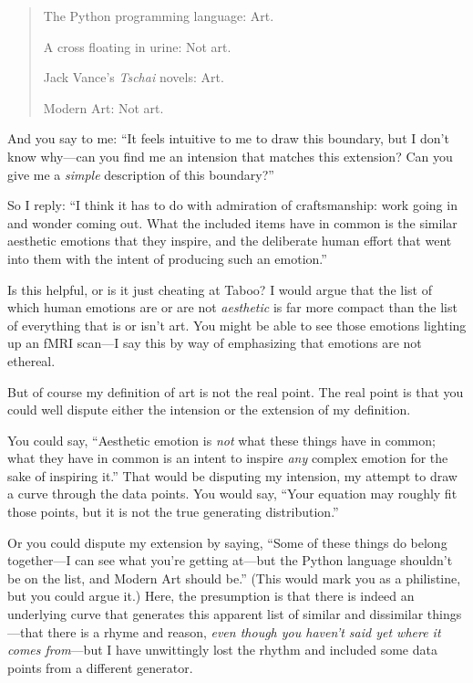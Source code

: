 {{\begin{quote}
{
 The Python programming language: Art.}

{
 A cross floating in urine: Not art.}

{
 Jack Vance's \textit{Tschai} novels: Art.}

{
  Modern Art: Not art.}
\end{quote}

{
 And you say to me: ``It feels intuitive to me to
draw this boundary, but I don't know why---can you find
me an intension that matches this extension? Can you give me a
\textit{simple} description of this boundary?''}

{
 So I reply: ``I think it has to do with
admiration of craftsmanship: work going in and wonder coming out. What
the included items have in common is the similar aesthetic emotions
that they inspire, and the deliberate human effort that went into them
with the intent of producing such an emotion.''}

{
 Is this helpful, or is it just cheating at Taboo? I would argue
that the list of which human emotions are or are not \textit{aesthetic}
is far more compact than the list of everything that is or
isn't art. You might be able to see those emotions
lighting up an fMRI scan---I say this by way of emphasizing that
emotions are not ethereal.}

{
 But of course my definition of art is not the real point. The real
point is that you could well dispute either the intension or the
extension of my definition.}

{
 You could say, ``Aesthetic emotion is
\textit{not} what these things have in common; what they have in common
is an intent to inspire \textit{any} complex emotion for the sake of
inspiring it.'' That would be disputing my intension,
my attempt to draw a curve through the data points. You would say,
``Your equation may roughly fit those points, but it
is not the true generating distribution.''}

{
 Or you could dispute my extension by saying,
``Some of these things do belong together---I can see
 what you're getting at---but the Python language
 shouldn't be on the list, and Modern Art should
be.'' (This would mark you as a philistine, but you
could argue it.) Here, the presumption is that there is indeed an
underlying curve that generates this apparent list of similar and
dissimilar things---that there is a rhyme and reason, \textit{even
though you haven't said yet where it comes
from}{}---but I have unwittingly lost the rhythm and included some data
points from a different generator.}

}}
